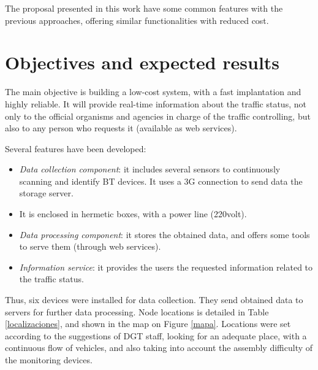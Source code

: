 \documentclass{llncs}
\begin{document}
The proposal presented in this work have some common features with the previous approaches, offering similar functionalities with reduced cost.


\section{Objectives and expected results}
\label{obj}

The main objective is building a low-cost system, with a fast implantation and highly reliable. 
It will provide real-time information about the traffic status, not only to the official organisms and agencies in charge of the traffic controlling, but also to any person who requests it (available as web services).

Several features have been developed:

\begin{itemize}
  \item \textit{Data collection component}: it includes several sensors to continuously scanning and identify BT devices. It uses a 3G connection to send data the storage server.
  
  \item It is enclosed in hermetic boxes, with a power line (220volt).

  \item \textit{Data processing component}: it stores the obtained data, and offers some tools to serve them (through web services).

  \item \textit{Information service}: it provides the users the requested information related to the traffic status.
\end{itemize}

Thus, six devices were installed for data collection. They send obtained data to servers for further data processing. 
Node locations is detailed in Table \ref{localizaciones}, and shown in the map on Figure \ref{mapa}.
Locations were set according to the suggestions of DGT staff, looking for an adequate place, with a continuous flow of vehicles, and also taking into account the assembly difficulty of the monitoring devices.
\end{document}
